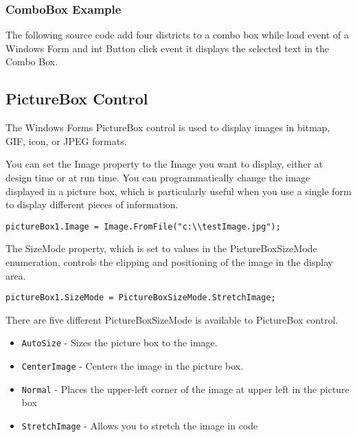 \subsubsection*{ComboBox Example}
The following {\cs} source code add four districts to a combo box while load event of a Windows Form and int Button click event it displays the selected text in the Combo Box.


\subsection{PictureBox Control}
The Windows Forms PictureBox control is used to display images in bitmap, GIF, icon, or JPEG formats.


You can set the Image property to the Image you want to display, either at design time or at run time. You can programmatically change the image displayed in a picture box, which is particularly useful when you use a single form to display different pieces of information.

\begin{lstlisting}[numbers=none]
	pictureBox1.Image = Image.FromFile("c:\\testImage.jpg");
\end{lstlisting}

The SizeMode property, which is set to values in the PictureBoxSizeMode enumeration, controls the clipping and positioning of the image in the display area.

\begin{lstlisting}[numbers=none]
	pictureBox1.SizeMode = PictureBoxSizeMode.StretchImage;
\end{lstlisting}

There are five different PictureBoxSizeMode is available to PictureBox control.

\begin{itemize}
	\item \verb*|AutoSize| - Sizes the picture box to the image.
	\item \verb*|CenterImage| - Centers the image in the picture box.
	\item \verb*|Normal| - Places the upper-left corner of the image at upper left in the picture box
	\item \verb*|StretchImage| - Allows you to stretch the image in code
\end{itemize}


